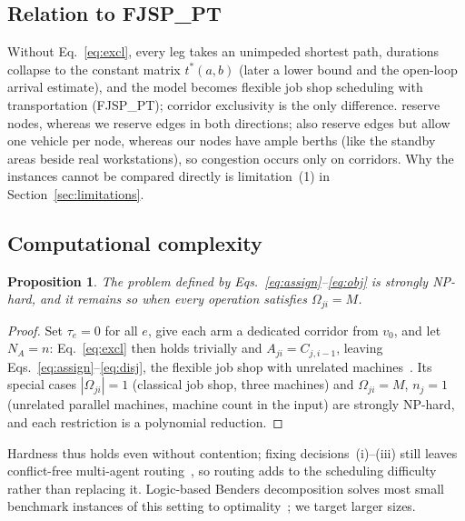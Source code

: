 \documentclass[preprint,review,12pt,authoryear]{elsarticle}
\newtheorem{prop}{Proposition}
\begin{document}
\subsection{Relation to FJSP\_PT}
\label{sec:fjsppt}

Without Eq.~\eqref{eq:excl}, every leg takes an unimpeded shortest path, durations collapse to the constant matrix $t^{*}(a,b)$ (later a lower bound and the open-loop arrival estimate), and the model becomes flexible job shop scheduling with transportation (FJSP\_PT); corridor exclusivity is the only difference.
\citet{vanos2026exact} reserve nodes, whereas we reserve edges in both directions; \citet{lyu2019approach} also reserve edges but allow one vehicle per node, whereas our nodes have ample berths (like the standby areas beside real workstations), so congestion occurs only on corridors.
Why the instances cannot be compared directly is limitation~(1) in Section~\ref{sec:limitations}.

\subsection{Computational complexity}

\begin{prop}
\label{prop:np_hard}
The problem defined by Eqs.~\eqref{eq:assign}--\eqref{eq:obj} is strongly NP-hard, and it remains so when every operation satisfies
$\Omega_{ji}=M$.
\end{prop}

\begin{proof}
Set $\tau_e=0$ for all $e$, give each arm a dedicated corridor from $v_0$, and let $N_A=n$: Eq.~\eqref{eq:excl} then holds trivially and $A_{ji}=C_{j,i-1}$, leaving Eqs.~\eqref{eq:assign}--\eqref{eq:disj}, the flexible job shop with unrelated machines~\citep{dauzereperes2024fjsp}.
Its special cases $|\Omega_{ji}|=1$ (classical job shop, three machines) and $\Omega_{ji}=M$, $n_j=1$ (unrelated parallel machines, machine count in the input) are strongly NP-hard, and each restriction is a polynomial reduction.
\end{proof}

Hardness thus holds even without contention; fixing decisions~(i)--(iii) still leaves conflict-free multi-agent routing~\citep{gao2023mapf}, so routing adds to the scheduling difficulty rather than replacing it.
Logic-based Benders decomposition solves most small benchmark instances of this setting to optimality~\citep{vanos2026exact}; we target larger sizes.
\end{document}
